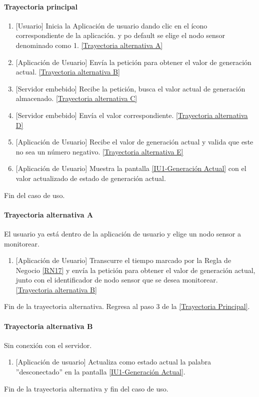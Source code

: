 \paragraph{Trayectoria principal}
    \label{SUB-U-CU1.1:TP}
	\begin{enumerate}
	    \item {[Usuario]} Inicia la Aplicación de usuario dando clic en el ícono correspondiente de la aplicación. y po default se elige el nodo sensor denominado como 1. \hyperref[SUB-U-CU1.1:TA]{[Trayectoria alternativa A]}
	    \item {[Aplicación de Usuario]} Envía la petición para obtener el valor de generación actual. \hyperref[SUB-U-CU1.1:TB]{[Trayectoria alternativa B]} 
	    \item {[Servidor embebido]} Recibe la petición, busca el valor actual de generación almacenado. \hyperref[SUB-U-CU1.1:TC]{[Trayectoria alternativa C]}
	    \item {[Servidor embebido]} Envía el valor correspondiente. \hyperref[SUB-U-CU1.1:TD]{[Trayectoria alternativa D]} 
	    \item {[Aplicación de Usuario]} Recibe el valor de generación actual y valida que este no sea un número negativo. \hyperref[SUB-U-CU1.1:TE]{[Trayectoria alternativa E]} 
	    \item {[Aplicación de Usuario]} Muestra la pantalla \hyperref[fig:monitoreo]{[IU1-Generación Actual]} con el valor actualizado de estado de generación actual.
	\end{enumerate}
	Fin del caso de uso.

\paragraph{Trayectoria alternativa A} \label{SUB-U-CU1.1:TA}
	El usuario ya está dentro de la aplicación de usuario y elige un nodo sensor a monitorear.
	\begin{enumerate}[label=A\arabic*.]
		\item {[Aplicación de Usuario]} Transcurre el tiempo marcado por la Regla de Negocio \ref{RN17} y envía la petición para obtener el valor de generación actual, junto con el identificador de nodo sensor que se desea monitorear. \hyperref[SUB-U-CU1.1:TB]{[Trayectoria alternativa B]} 
	\end{enumerate}
	Fin de la trayectoria alternativa. Regresa al paso 3 de la \hyperref[SUB-U-CU1.1:TP]{[Trayectoria Principal]}.

\paragraph{Trayectoria alternativa B} \label{SUB-U-CU1.1:TB}
	Sin conexión con el servidor.
	\begin{enumerate}[label=B\arabic*.]
		\item {[Aplicación de usuario]} Actualiza como estado actual la palabra ''desconectado'' en la pantalla \hyperref[fig:monitoreo]{[IU1-Generación Actual]}.
	\end{enumerate}
	Fin de la trayectoria alternativa y fin del caso de uso.

